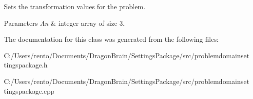 Sets the transformation values for the problem. 


\begin{DoxyParams}{Parameters}
{\em An} & integer array of size 3. \\
\hline
\end{DoxyParams}


The documentation for this class was generated from the following files\+:\begin{DoxyCompactItemize}
\item 
C\+:/\+Users/rento/\+Documents/\+Dragon\+Brain/\+Settings\+Package/src/problemdomainsettingspackage.\+h\item 
C\+:/\+Users/rento/\+Documents/\+Dragon\+Brain/\+Settings\+Package/src/problemdomainsettingspackage.\+cpp\end{DoxyCompactItemize}
